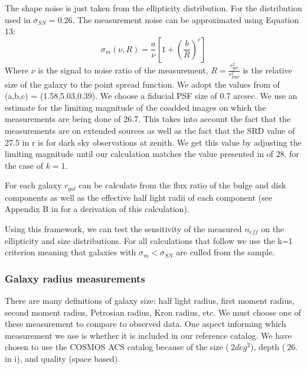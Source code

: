 \documentclass[]{article}
\begin{document}
The shape noise is just taken from the ellipticity distribution.  For the distribution used in \cite{chang} $\sigma_{SN} = 0.26$.
The measurement noise can be approximated using Equation 13:
\begin{equation}
\sigma_m(\nu,R) = \frac{a}{\nu}\left[1+\left(\frac{b}{R}\right)^c\right]
\end{equation}
Where $\nu$ is the signal to noise ratio of the measurement, $R=\frac{r_{gal}^2}{r_{PSF}^2}$ is the relative size of the galaxy to
the point spread function.  We adopt the values from \cite{chang} of (a,b,c) = (1.58,5.03,0.39).  We choose a fiducial
PSF size of 0.7 arcsec. We use an estimate for the limiting magnitude of the coadded images on which the measurements are being
done of 26.7.  This takes into account the fact that the measurements are on extended sources as well as the fact that the SRD value 
of 27.5 in r is for dark sky observations at zenith.  We get this value by adjusting the limiting magnitude until our calculation
matches the value presented in \cite{chang} of 28. for the case of $k=1$.

For each galaxy $r_{gal}$ can be calculate from the flux ratio of the bulge and disk components as well as the effective half light 
radii of each component (see Appendix B in \cite{chang} for a derivation of this calculation).

Using this framework, we can test the sensitivity of the measured $n_{eff}$ on the ellipticity and size distributions.  For all calculations that follow we 
use the k=1 criterion meaning that galaxies with $\sigma_m < \sigma_{SN}$ are culled from the sample.

\subsubsection{Galaxy radius measurements}
There are many definitions of galaxy size: half light radius, first moment radius, second moment radius, Petrosian radius, Kron radius, etc.
We must choose one of these measurement to compare to observed data.  One aspect informing which measurement we use is whether it is included 
in our reference catalog.  We have chosen to use the COSMOS ACS catalog \cite{cosmos} because of the size ($~2deg^2$), depth ($~26.$ in i), and
quality (space based).  
\end{document}
